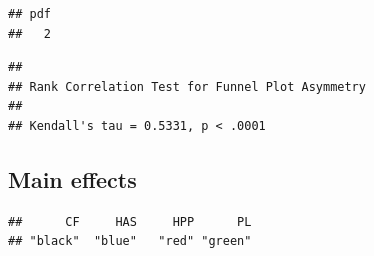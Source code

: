 \documentclass[man]{apa6}
\begin{document}
\begin{verbatim}
## pdf 
##   2
\end{verbatim}

\begin{verbatim}
## 
## Rank Correlation Test for Funnel Plot Asymmetry
## 
## Kendall's tau = 0.5331, p < .0001
\end{verbatim}

\subsection{Main effects}\label{main-effects}

\begin{verbatim}
##      CF     HAS     HPP      PL 
## "black"  "blue"   "red" "green"
\end{verbatim}
\end{document}
